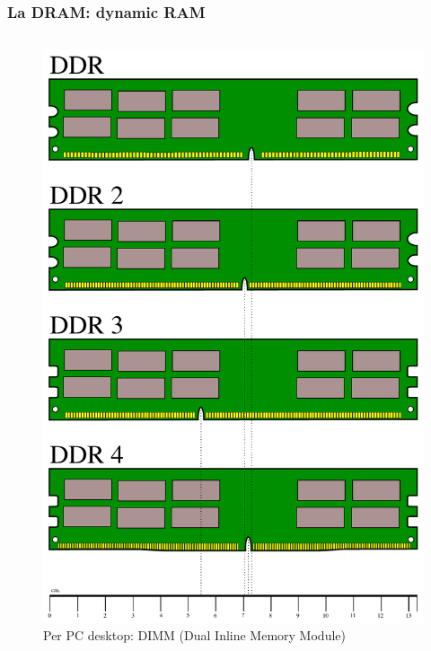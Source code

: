 \begin{frame}
	\frametitle{La DRAM: dynamic RAM}
	 

	\begin{columns}			
		\begin{figure}[!htbp]
			\centering 
			\includegraphics[width=0.63\linewidth]{images/5_memory/dimm.pdf}
			\caption{Per PC desktop: \protect\linebreak DIMM (Dual Inline Memory Module)}
			\label{fig:memory_dimm}
		\end{figure}


\end{columns}
\end{frame}
